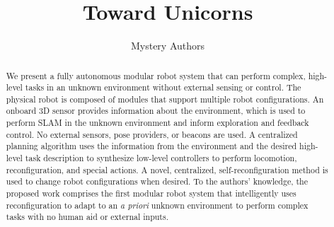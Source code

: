 \documentclass[conference]{IEEEtran}
\begin{document}
\title{Toward Unicorns}

\author{Mystery Authors}


\maketitle

\begin{abstract}

We present a fully autonomous modular robot system that can perform complex, high-level tasks in an unknown environment without external sensing or control. The physical robot is composed of modules that support multiple robot configurations. An onboard 3D sensor provides information about the environment, which is used to perform SLAM in the unknown environment and inform exploration and feedback control. No external sensors, pose providers, or beacons are used. A centralized planning algorithm uses the information from the environment and the desired high-level task description to synthesize low-level controllers to perform locomotion, reconfiguration, and special actions. A novel, centralized, self-reconfiguration method is used to change robot configurations when desired. To the authors' knowledge, the proposed work comprises the first modular robot system that intelligently uses reconfiguration to adapt to an \textit{a priori} unknown environment to perform complex tasks with no human aid or external inputs.



\end{abstract}

\IEEEpeerreviewmaketitle

\end{document}
